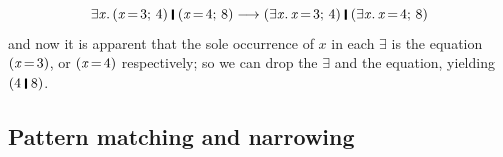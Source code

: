 \documentclass[acmsmall]{acmart}
\newcommand{\Varid}[1]{\mathit{#1}}
\begin{document}
$$
\ensuremath{\exists\Varid{x}.\,(\Varid{x}\hspace{-0.14em}=\hspace{-0.14em}\mathrm{3};\,\mathrm{4})\;\rule[-0.1em]{0.15em}{0.75em}\;(\Varid{x}\hspace{-0.14em}=\hspace{-0.14em}\mathrm{4};\,\mathrm{8})} \movesto \ensuremath{(\exists\Varid{x}.\,\Varid{x}\hspace{-0.14em}=\hspace{-0.14em}\mathrm{3};\,\mathrm{4})\;\rule[-0.1em]{0.15em}{0.75em}\;(\exists\Varid{x}.\,\Varid{x}\hspace{-0.14em}=\hspace{-0.14em}\mathrm{4};\,\mathrm{8})}
$$
and now it is apparent that the sole occurrence of \ensuremath{\Varid{x}} in each \ensuremath{\exists{}} is the equation
\ensuremath{(\Varid{x}\hspace{-0.14em}=\hspace{-0.14em}\mathrm{3})}, or \ensuremath{(\Varid{x}\hspace{-0.14em}=\hspace{-0.14em}\mathrm{4})} respectively; so we can drop the \ensuremath{\exists{}} and the equation, yielding \ensuremath{(\mathrm{4}\;\rule[-0.1em]{0.15em}{0.75em}\;\mathrm{8})}.

\subsection{Pattern matching and narrowing}
\end{document}
